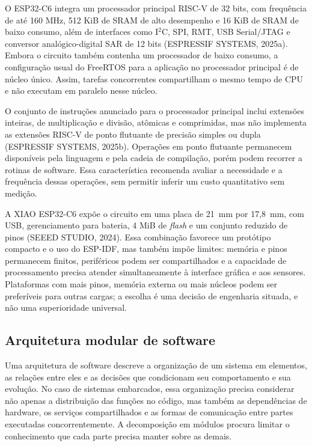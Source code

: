 \documentclass[a4paper,12pt]{article}
\begin{document}
O ESP32-C6 integra um processador principal RISC-V de 32 bits, com frequ\^encia de at\'e 160 MHz, 512 KiB de SRAM de alto desempenho e 16 KiB de SRAM de baixo consumo, al\'em de interfaces como I$^2$C, SPI, RMT, USB Serial/JTAG e conversor anal\'ogico-digital SAR de 12 bits (ESPRESSIF SYSTEMS, 2025a). Embora o circuito tamb\'em contenha um processador de baixo consumo, a configura\c{c}\~ao usual do FreeRTOS para a aplica\c{c}\~ao no processador principal \'e de n\'ucleo \'unico. Assim, tarefas concorrentes compartilham o mesmo tempo de CPU e n\~ao executam em paralelo nesse n\'ucleo.


O conjunto de instru\c{c}\~oes anunciado para o processador principal inclui extens\~oes inteiras, de multiplica\c{c}\~ao e divis\~ao, at\^omicas e comprimidas, mas n\~ao implementa as extens\~oes RISC-V de ponto flutuante de precis\~ao simples ou dupla (ESPRESSIF SYSTEMS, 2025b). Opera\c{c}\~oes em ponto flutuante permanecem dispon\'iveis pela linguagem e pela cadeia de compila\c{c}\~ao, por\'em podem recorrer a rotinas de software. Essa caracter\'istica recomenda avaliar a necessidade e a frequ\^encia dessas opera\c{c}\~oes, sem permitir inferir um custo quantitativo sem medi\c{c}\~ao.


A XIAO ESP32-C6 exp\~oe o circuito em uma placa de 21~mm por 17,8~mm, com USB, gerenciamento para bateria, 4 MiB de \emph{flash} e um conjunto reduzido de pinos (SEEED STUDIO, 2024). Essa combina\c{c}\~ao favorece um prot\'otipo compacto e o uso do ESP-IDF, mas tamb\'em imp\~oe limites: mem\'oria e pinos permanecem finitos, perif\'ericos podem ser compartilhados e a capacidade de processamento precisa atender simultaneamente \`a interface gr\'afica e aos sensores. Plataformas com mais pinos, mem\'oria externa ou mais n\'ucleos podem ser prefer\'iveis para outras cargas; a escolha \'e uma decis\~ao de engenharia situada, e n\~ao uma superioridade universal.


\subsection{Arquitetura modular de software}


Uma arquitetura de software descreve a organiza\c{c}\~ao de um sistema em elementos, as rela\c{c}\~oes entre eles e as decis\~oes que condicionam seu comportamento e sua evolu\c{c}\~ao. No caso de sistemas embarcados, essa organiza\c{c}\~ao precisa considerar n\~ao apenas a distribui\c{c}\~ao das fun\c{c}\~oes no c\'odigo, mas tamb\'em as depend\^encias de hardware, os servi\c{c}os compartilhados e as formas de comunica\c{c}\~ao entre partes executadas concorrentemente. A decomposi\c{c}\~ao em m\'odulos procura limitar o conhecimento que cada parte precisa manter sobre as demais.
\end{document}
